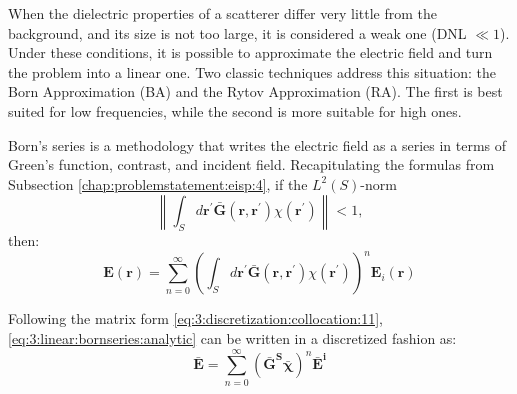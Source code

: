 			When the dielectric properties of a scatterer differ very little from the background, and its size is not too large, it is considered a weak one (DNL $\ll1$). Under these conditions, it is possible to approximate the electric field and turn the problem into a linear one. Two classic techniques address this situation: the Born Approximation (BA) and the Rytov Approximation (RA). The first is best suited for low frequencies, while the second is more suitable for high ones.
			
			Born's series is a methodology that writes the electric field as a series in terms of Green's function, contrast, and incident field. Recapitulating the formulas from Subsection \ref{chap:problemstatement:eisp:4}, if the $L^2(S)$-norm $$\left\|\int_S d\mathbf{r^\prime} \mathbf{\bar{G}}(\mathbf{r},\mathbf{r^\prime})\chi(\mathbf{\mathbf{r^\prime}})\right\|<1,$$ then:
			\begin{equation}
				\mathbf{E}(\mathbf{r}) = \sum\limits_{n=0}^\infty \left(\int_Sd\mathbf{r^\prime} \mathbf{\bar{G}}(\mathbf{r},\mathbf{r^\prime})\chi(\mathbf{r^\prime})\right)^n\mathbf{E}_i(\mathbf{r}) \label{eq:3:linear:bornseries:analytic}
			\end{equation}
			
			Following the matrix form \eqref{eq:3:discretization:collocation:11}, \eqref{eq:3:linear:bornseries:analytic} can be written in a discretized fashion as:
			\begin{equation}
				\mathbf{\bar{E}} = \sum\limits_{n=0}^\infty (\mathbf{\bar{G}^S}\boldsymbol{\bar{\chi}})^n\mathbf{\bar{E}^i} \label{eq:3:linear:bornseries:discrete}
			\end{equation}
			
